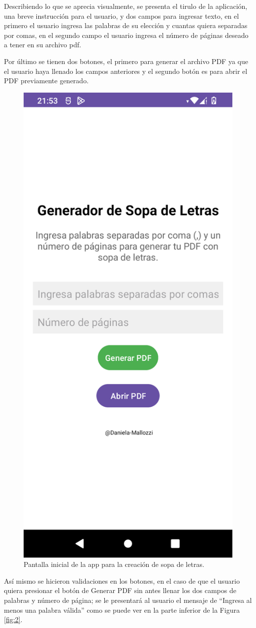\documentclass[conference]{IEEEtran}
\begin{document}
Describiendo lo que se aprecia visualmente, se presenta el tirulo de la aplicación, una breve instrucción para el usuario, y dos campos para ingresar texto, en el primero el usuario ingresa las palabras de su elección y cuantas quiera separadas por comas, en el segundo campo el usuario ingresa el número de páginas deseado a tener en su archivo pdf.

Por último se tienen dos botones, el primero para generar el archivo PDF ya que el usuario haya llenado los campos anteriores y el segundo botón es para abrir el PDF previamente generado.
\begin{figure}[H]
    \centering
    \includegraphics[width=0.6\columnwidth]{imagenes/inicio.png}
    \caption{Pantalla inicial de la app para la creación de sopa de letras.}
    \label{fig:1}
\end{figure}
Así mismo se hicieron validaciones en los botones, en el caso de que el usuario quiera presionar el botón de Generar PDF sin antes llenar los dos campos de palabras y número de página; se le presentará al usuario el mensaje de \enquote{Ingresa al menos una palabra válida} como se puede ver en la parte inferior de la Figura \ref{fig:2}.
\end{document}
